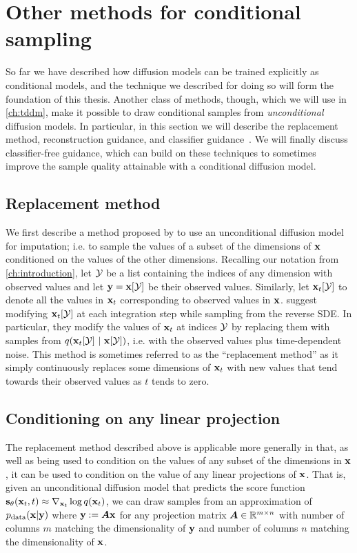 \section{Other methods for conditional sampling} \label{sec:other-methods-for-conditional-sampling}
So far we have described how diffusion models can be trained explicitly as conditional models, and the technique we described for doing so will form the foundation of this thesis. Another class of methods, though, which we will use in \cref{ch:tddm}, make it possible to draw conditional samples from \textit{unconditional} diffusion models. In particular, in this section we will describe the replacement method, reconstruction guidance, and classifier guidance~\citep{song2020score,kadkhodaie2020solving,mittal2021symbolic,ho2022video}. We will finally discuss classifier-free guidance, which can build on these techniques to sometimes improve the sample quality attainable with a conditional diffusion model.

\subsection{Replacement method}
We first describe a method proposed by \citet{song2020score} to use an unconditional diffusion model for imputation; i.e. to sample the values of a subset of the dimensions of ${\mathbf{x}}$ conditioned on the values of the other dimensions. Recalling our notation from \cref{ch:introduction}, let ${\mathcal{Y}}$ be a list containing the indices of any dimension with observed values and let ${\mathbf{y}} = {\mathbf{x}}[{\mathcal{Y}}]$ be their observed values.
Similarly, let ${\mathbf{x}}_t[{\mathcal{Y}}]$ to denote all the values in ${\mathbf{x}}_t$ corresponding to observed values in ${\mathbf{x}}$.
\citet{song2020score} suggest modifying ${\mathbf{x}}_t[{\mathcal{Y}}]$ at each integration step while sampling from the reverse SDE. In particular, they modify the values of ${\mathbf{x}}_t$ at indices ${\mathcal{Y}}$ by replacing them with samples from $q({\mathbf{x}}_t[{\mathcal{Y}}] ~|~ {\mathbf{x}}[{\mathcal{Y}}] )$, i.e. with the observed values plus time-dependent noise. This method is sometimes referred to as the ``replacement method'' as it simply continuously replaces some dimensions of ${\mathbf{x}}_t$ with new values that tend towards their observed values as $t$ tends to zero.

\subsection{Conditioning on any linear projection}
The replacement method described above is applicable more generally in that, as well as being used to condition on the values of any subset of the dimensions in ${\mathbf{x}}$, it can be used to condition on the value of any linear projections of ${\mathbf{x}}$. That is, given an unconditional diffusion model that predicts the score function ${\mathbf{s}}_\theta({\mathbf{x}}_t, t) \approx \nabla_{{\mathbf{x}}_t} \log q({\mathbf{x}}_t)$, we can draw samples from an approximation of $p_{\rm{data}}({\mathbf{x}}|{\mathbf{y}})$ where ${\mathbf{y}}:={\bm{A}}{\mathbf{x}}$ for any projection matrix ${\bm{A}} \in \mathbb{R}^{m \times n}$ with number of columns $m$ matching the dimensionality of ${\mathbf{y}}$ and number of columns $n$ matching the dimensionality of ${\mathbf{x}}$.


